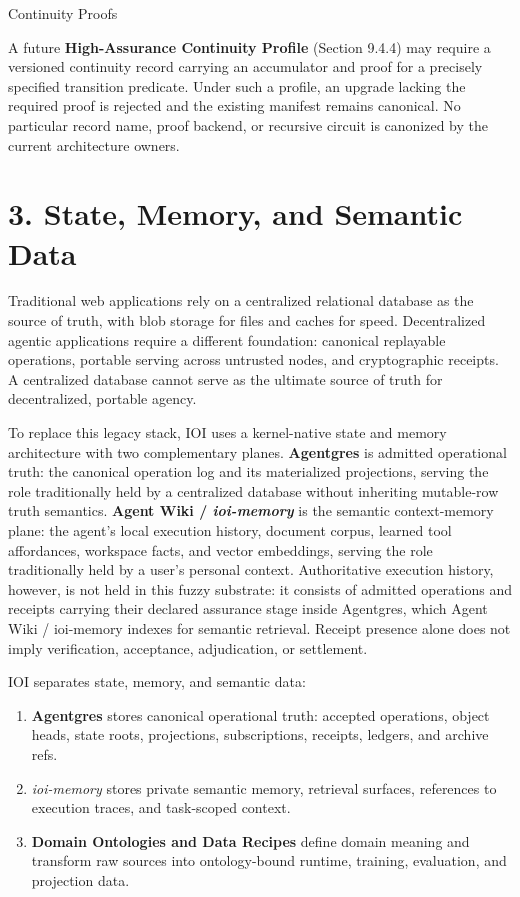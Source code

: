 \documentclass[
  11pt,
]{article}
\providecommand{\tightlist}{%
  \setlength{\itemsep}{0pt}\setlength{\parskip}{0pt}}
\begin{document}
Continuity Proofs

A future \textbf{High-Assurance Continuity Profile} (Section 9.4.4) may
require a versioned continuity record carrying an accumulator and proof for a
precisely specified transition predicate. Under such a profile, an upgrade
lacking the required proof is rejected and the existing manifest remains
canonical. No particular record name, proof backend, or recursive circuit is
canonized by the current architecture owners.

\hypertarget{state-memory-and-semantic-data}{%
\section{3. State, Memory, and Semantic
Data}\label{state-memory-and-semantic-data}}

Traditional web applications rely on a centralized relational database
as the source of truth, with blob storage for files and caches for
speed. Decentralized agentic applications require a different
foundation: canonical replayable operations, portable serving across
untrusted nodes, and cryptographic receipts. A centralized database
cannot serve as the ultimate source of truth for decentralized, portable
agency.

To replace this legacy stack, IOI uses a kernel-native state and memory
architecture with two complementary planes. \textbf{Agentgres} is
admitted operational truth: the canonical operation log and its
materialized projections, serving the role traditionally held by a
centralized database without inheriting mutable-row truth semantics.
\textbf{Agent Wiki / \emph{ioi-memory}} is the semantic context-memory
plane: the agent's local execution history, document corpus, learned
tool affordances, workspace facts, and vector embeddings, serving the
  role traditionally held by a user's personal context. Authoritative
  execution history, however, is not held in this fuzzy substrate: it
  consists of admitted operations and receipts carrying their declared
  assurance stage inside Agentgres, which Agent Wiki / ioi-memory indexes for
  semantic retrieval. Receipt presence alone does not imply verification,
  acceptance, adjudication, or settlement.

IOI separates state, memory, and semantic data:

\begin{enumerate}
\def\labelenumi{\arabic{enumi}.}
\tightlist
\item
  \textbf{Agentgres} stores canonical operational truth: accepted
  operations, object heads, state roots, projections, subscriptions,
  receipts, ledgers, and archive refs.
\item
  \emph{ioi-memory} stores private semantic memory, retrieval surfaces,
  references to execution traces, and task-scoped context.
\item
  \textbf{Domain Ontologies and Data Recipes} define domain meaning and
  transform raw sources into ontology-bound runtime, training,
  evaluation, and projection data.
\end{enumerate}
\end{document}
